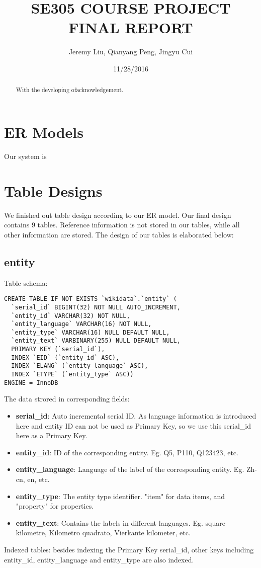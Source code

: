 \documentclass[12pt]{article}
\title{SE305 COURSE PROJECT FINAL REPORT}
\author{Jeremy Liu, Qianyang Peng, Jingyu Cui}
\date{11/28/2016}
\begin{document}
\maketitle
\tableofcontents
\newpage
{}

\begin{abstract}
	With the developing ofacknowledgement.
\end{abstract}

\section{ER Models}
Our system is 

\section{Table Designs}
We finished out table design according to our ER model. Our final design contains 9 tables. Reference information is not stored in our tables, while all other information are stored. The design of our tables is elaborated below:
\subsection{entity}
\lstset{language=SQL}
Table schema:
\begin{lstlisting}
CREATE TABLE IF NOT EXISTS `wikidata`.`entity` (
  `serial_id` BIGINT(32) NOT NULL AUTO_INCREMENT,
  `entity_id` VARCHAR(32) NOT NULL,
  `entity_language` VARCHAR(16) NOT NULL,
  `entity_type` VARCHAR(16) NULL DEFAULT NULL,
  `entity_text` VARBINARY(255) NULL DEFAULT NULL,
  PRIMARY KEY (`serial_id`),
  INDEX `EID` (`entity_id` ASC),
  INDEX `ELANG` (`entity_language` ASC),
  INDEX `ETYPE` (`entity_type` ASC))
ENGINE = InnoDB
\end{lstlisting}
The data strored in corresponding fields:
\begin{itemize}
\item \textbf{serial\_id}: Auto incremental serial ID. As language information is introduced here and entity ID can not be used as Primary Key, so we use this serial\_id here as a Primary Key.
\item \textbf{entity\_id}: ID of the corresponding entity. Eg. Q5, P110, Q123423, etc.
\item \textbf{entity\_language}: Language of the label of the corresponding entity. Eg. Zh-cn, en, etc.
\item \textbf{entity\_type}: The entity type identifier. "item" for data items, and "property" for properties.
\item \textbf{entity\_text}: Contains the labels in different languages. Eg. square kilometre, Kilometro quadrato, Vierkante kilometer, etc.
\end{itemize}
Indexed tables: besides indexing the Primary Key serial\_id, other keys including entity\_id, entity\_language and entity\_type are also indexed.
\end{document}
